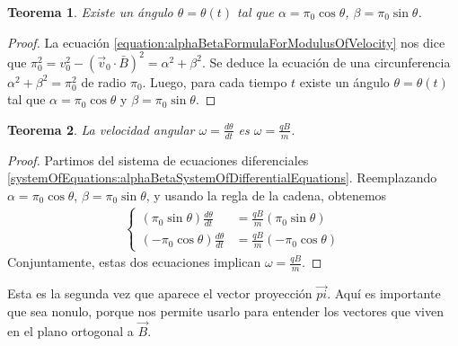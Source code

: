 \documentclass{article}
\newtheorem{theorem}{Teorema}
\begin{document}
  \begin{theorem}
    \label{theorem:alphaBetaDescribeCircularMotion}
    Existe un ángulo \(\theta = \theta(t)\) tal que \(\alpha = \pi_0 \cos \theta\), \(\beta = \pi_0 \sin \theta\).
  \end{theorem}
  \begin{proof}
    La ecuación \ref{equation:alphaBetaFormulaForModulusOfVelocity} nos dice que \(\pi_0^2 = v_0^2 - (\vec{v}_0 \cdot \bar{B})^2 = \alpha^2 + \beta^2\).
    Se deduce la ecuación de una circunferencia \(\alpha^2 + \beta^2 = \pi_0^2\) de radio \(\pi_0\).
    Luego, para cada tiempo \(t\) existe un ángulo \(\theta = \theta(t)\) tal que \(\alpha = \pi_0 \cos \theta\) y \(\beta = \pi_0 \sin \theta\).
  \end{proof}

  \begin{theorem}
    \label{theorem:thetaDifferentialEquation}
    La velocidad angular \(\omega = \frac{d \theta}{d t}\) es \(\omega = \frac{q B}{m}\).
  \end{theorem}
  \begin{proof}
    Partimos del sistema de ecuaciones diferenciales \eqref{systemOfEquations:alphaBetaSystemOfDifferentialEquations}.
    Reemplazando \(\alpha = \pi_0 \cos \theta\), \(\beta = \pi_0 \sin \theta\), y usando la regla de la cadena, obtenemos
    \begin{align}
      \left\{
        \begin{aligned}
          (\pi_0 \sin \theta) \frac{d \theta}{d t}
          &=
          \frac{q B}{m} (\pi_0 \sin \theta)
          \\
          (- \pi_0 \cos \theta) \frac{d \theta}{d t}
          &=
          \frac{q B}{m} (- \pi_0 \cos \theta)
        \end{aligned}
      \right.
    \end{align}
    Conjuntamente, estas dos ecuaciones implican \(\omega = \frac{q B}{m}\).
  \end{proof}

  Esta es la segunda vez que aparece el vector proyección \(\vec{pi}\).
  Aquí es importante que sea nonulo, porque nos permite usarlo para entender los vectores que viven en el plano ortogonal a \(\vec{B}\).
\end{document}
